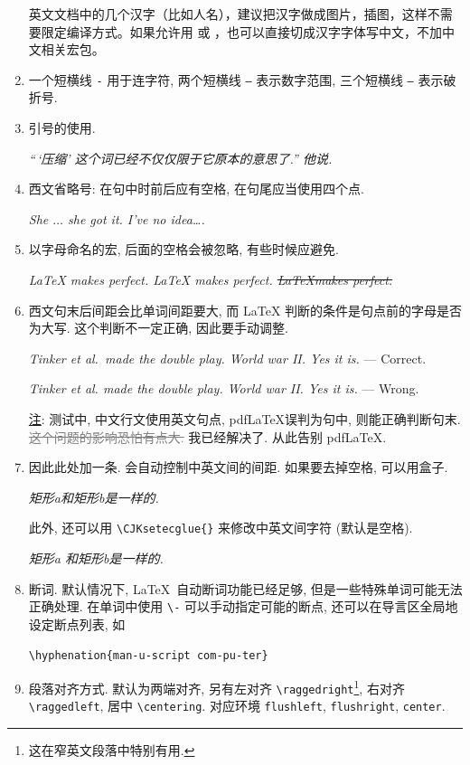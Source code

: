 \documentclass[UTF8,no-math]{ctexart}
\numberwithin{enumi}{section}
\begin{document}
\begin{enumerate}
\begin{bdquote}[indent]
        英文文档中的几个汉字（比如人名），建议把汉字做成图片，插图，这样不需要限定编译方式。如果允许用 \XeTeX 或 \LuaTeX，也可以直接切成汉字字体写中文，不加中文相关宏包。    
        \end{bdquote}
        \item 一个短横线 \texttt{-} 用于连字符, 两个短横线 \texttt{--} 表示数字范围, 三个短横线 \texttt{---} 表示破折号.
        \item 引号的使用. \par \emph{``\,`压缩' 这个词已经不仅仅限于它原本的意思了.'' 他说.}
        \item 西文省略号: 在句中时前后应有空格, 在句尾应当使用四个点. \par \emph{She $\ldots$ she got it. I've no idea\ldots. }
        \item 以字母命名的宏, 后面的空格会被忽略, 有些时候应避免.\par \emph{\LaTeX{} makes perfect. {\LaTeX} makes perfect. \sout{\LaTeX makes perfect.}}
        \item 西文句末后间距会比单词间距要大, 而 \LaTeX{} 判断的条件是句点前的字母是否为大写. 这个判断不一定正确, 因此要手动调整. \par \emph{Tinker et al.\ made the double play. World war II\@. Yes it is.} --- Correct. \par \emph{Tinker et al. made the double play. World war II. Yes it is.} --- Wrong.\par \uline{\fangsong 注}: 测试中, 中文行文使用英文句点, pdf\LaTeX 误判为句中, \XeLaTeX 则能正确判断句末. \textcolor{gray}{\sout{\faExclamationTriangle 这个问题的影响恐怕有点大.}} 我已经解决了. 从此告别 pdf\LaTeX. 
        \item 因此此处加一条. \XeLaTeX 会自动控制中英文间的间距. 如果要去掉空格, 可以用盒子. \par \emph{\mbox{矩形}a和矩形b是一样的.}\par 此外, 还可以用 \texttt{\textbackslash CJKsetecglue\{\}} 来修改中英文间字符 (默认是空格).\par \emph{\CJKsetecglue{-} 矩形a 和矩形b是一样的.}
        \item 断词. 默认情况下, \LaTeX\ 自动断词功能已经足够, 但是一些特殊单词可能无法正确处理. 在单词中使用 \verb|\-| 可以手动指定可能的断点, 还可以在导言区全局地设定断点列表, 如\par
        \verb|\hyphenation{man-u-script com-pu-ter}|
        \item 段落对齐方式. 默认为两端对齐, 另有左对齐 \verb|\raggedright|\footnote{这在窄英文段落中特别有用.}, 右对齐 \verb|\raggedleft|, 居中 \verb|\centering|. 对应环境 \verb|flushleft|, \verb|flushright|, \verb|center|. \par 

\end{enumerate}
\end{document}
